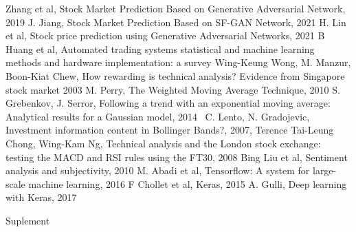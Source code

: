 \documentclass[11pt]{article} %
\begin{document}
\begin{thebibliography}{9}
Zhang et al, Stock Market Prediction Based on Generative Adversarial Network, 2019
J. Jiang, Stock Market Prediction Based on SF-GAN Network, 2021
H. Lin et al, Stock price prediction using Generative Adversarial Networks, 2021
B Huang et al, Automated trading systems statistical and machine learning methods and hardware implementation: a survey
Wing-Keung Wong, M. Manzur, Boon-Kiat Chew, How rewarding is technical analysis? Evidence from Singapore stock market 2003
M. Perry, The Weighted Moving Average Technique, 2010
S. Grebenkov, J. Serror, Following a trend with an exponential moving average: Analytical results for a Gaussian model, 2014\
C. Lento, N. Gradojevic, Investment information content in Bollinger Bands?, 2007, 
\bibitem{macd}
Terence Tai-Leung Chong, Wing-Kam Ng, Technical analysis and the London stock exchange: testing the MACD and RSI rules using the FT30, 2008
\bibitem{sentiment}
Bing Liu et al,  Sentiment analysis and subjectivity, 2010
M. Abadi et al, Tensorflow: A system for large-scale machine learning, 2016
\bibitem{keras}
F Chollet et al, Keras, 2015
A. Gulli,  Deep learning with Keras, 2017
\end{thebibliography}

\pagebreak
\hspace{0pt}
\vfill
\begin{center}
\begin{huge}
Suplement
\end{huge}
\end{center}
\vfill
\hspace{0pt}
\pagebreak
\end{document}

